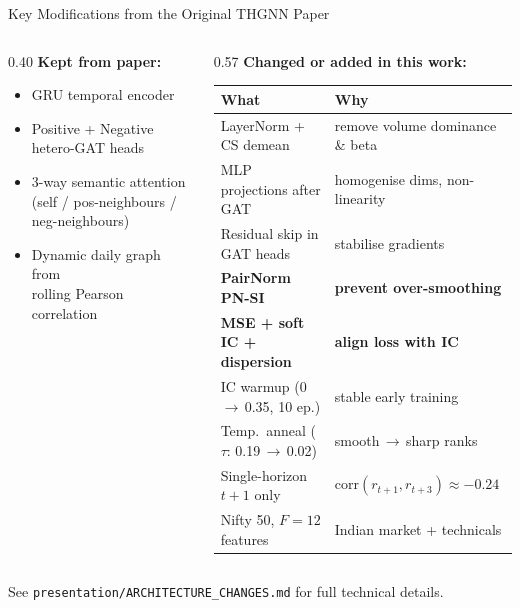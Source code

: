 \documentclass[aspectratio=169, 10pt]{beamer}
\newcommand{\cmark}{\textcolor{positive}{\textbf{\checkmark}}}
\begin{document}
\begin{frame}[shrink=5]{Key Modifications from the Original THGNN Paper}
  \begin{columns}[T]
    \begin{column}{0.40\textwidth}
      \textbf{Kept from paper:}
      \begin{itemize}\setlength{\itemsep}{3pt}
        \item[\cmark] GRU temporal encoder
        \item[\cmark] Positive + Negative hetero-GAT heads
        \item[\cmark] 3-way semantic attention\\
              {\small(self / pos-neighbours / neg-neighbours)}
        \item[\cmark] Dynamic daily graph from\\
              rolling Pearson correlation
      \end{itemize}
    \end{column}
    \begin{column}{0.57\textwidth}
      \textbf{Changed or added in this work:}
      \smallskip\\
      {\small
      \renewcommand{\arraystretch}{1.2}
      \begin{tabular}{@{}ll@{}}
        \toprule
        \textbf{What} & \textbf{Why} \\
        \midrule
        LayerNorm + CS demean & remove volume dominance \& beta\\
        MLP projections after GAT & homogenise dims, non-linearity\\
        Residual skip in GAT heads & stabilise gradients\\
        \textbf{PairNorm PN-SI} & \textbf{prevent over-smoothing}\\
        \midrule
        \textbf{MSE + soft IC + dispersion} & \textbf{align loss with IC}\\
        IC warmup (0\,$\to$\,0.35, 10 ep.) & stable early training\\
        Temp.\ anneal ($\tau$: 0.19\,$\to$\,0.02) & smooth\,$\to$\,sharp ranks\\
        \midrule
        Single-horizon $t{+}1$ only & $\text{corr}(r_{t+1},r_{t+3})\approx{-}0.24$\\
        Nifty 50, $F=12$ features & Indian market + technicals\\
        \bottomrule
      \end{tabular}}
    \end{column}
  \end{columns}
  \vspace{0.15cm}
  {\footnotesize See \texttt{presentation/ARCHITECTURE\_CHANGES.md} for full technical details.}
\end{frame}
\end{document}
